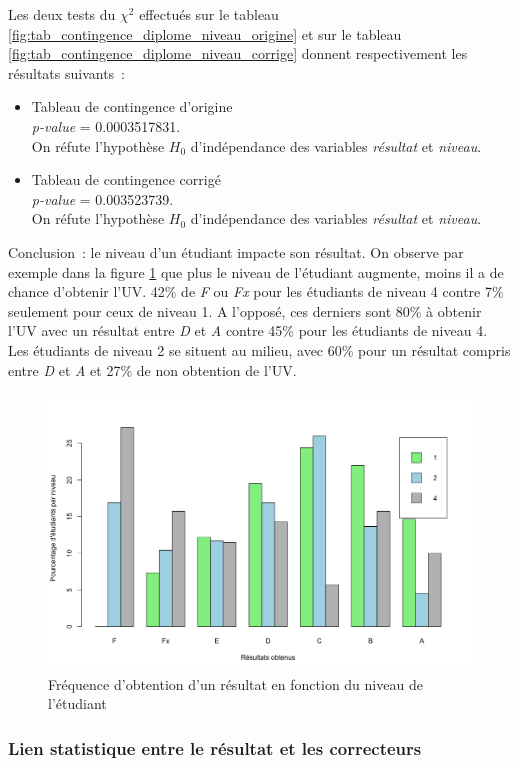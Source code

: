 \documentclass[a4paper,11pt]{report}
\begin{document}
Les deux tests du $\chi^2$ effectués sur le tableau \ref{fig:tab_contingence_diplome_niveau_origine} et sur le tableau \ref{fig:tab_contingence_diplome_niveau_corrige} donnent respectivement les résultats suivants~:
\begin{itemize}
	\item Tableau de contingence d'origine
	\\ \textit{p-value} = 0.0003517831.
	\\On réfute l'hypothèse $H_{0}$ d'indépendance des variables \textit{résultat} et \textit{niveau}.
	
	\item Tableau de contingence corrigé
	\\ \textit{p-value} = 0.003523739.
	\\On réfute l'hypothèse $H_{0}$ d'indépendance des variables \textit{résultat} et \textit{niveau}.
\end{itemize}
Conclusion~: le niveau d'un étudiant impacte son résultat. On observe par exemple dans la figure \ref{fig:frequence_resultats_niveau} que plus le niveau de l'étudiant augmente, moins il a de chance d'obtenir l'UV. 42\% de \textit{F} ou \textit{Fx} pour les étudiants de niveau 4 contre 7\% seulement pour ceux de niveau 1. A l'opposé, ces derniers sont 80\% à obtenir l'UV avec un résultat entre \textit{D} et \textit{A} contre 45\% pour les étudiants de niveau 4. Les étudiants de niveau 2 se situent au milieu, avec 60\% pour un résultat compris entre \textit{D} et \textit{A} et 27\% de non obtention de l'UV.

\begin{figure}[H]
	\centering
	\captionsetup{justification=centering, margin=2cm}
	\includegraphics[width=.5\linewidth]{img/1-1-2-Ratio-resultat-niveau}
	\caption{\scriptsize Fréquence d'obtention d'un résultat en fonction du niveau de l'étudiant}
	\label{fig:frequence_resultats_niveau}
\end{figure}

\subsubsection{Lien statistique entre le résultat et les correcteurs}
\end{document}
